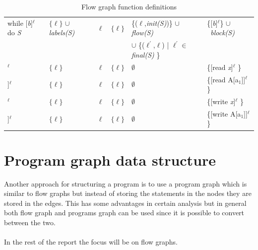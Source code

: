 \begin{table}
{\begin{minipage}{\textwidth}
\begin{tabular}{| l | l | l | l | l | l |}
\hline
while [\textsl{b}]$^\ell$ do \textsl{S} & $\{\ell\}$ $\cup$  \textsl{labels(S)}                 &$\ell$                & $\{\ell\}$ & \{($\ell$,\textsl{init(S)})\} $\cup$\textsl{flow(S)}                 & \{[\textsl{b}]$^\ell$\} $\cup$\ \textsl{block(S)} \\
&&&&$\cup$ \{($\ell^{'}$,$\ell$) |  $\ell^{'}\in$ \textsl{final(S)} \}&\\
\hline
[read \textsl{x}]$^\ell$                & $\{\ell\}$                                            &$\ell$                & $\{\ell\}$ & $\emptyset$                                            &\{[read \textsl{x}]$^\ell$ \}  \\
\hline
[read A[a$_1$]]$^\ell$                & $\{\ell\}$                                            &$\ell$                & $\{\ell\}$  & $\emptyset$                                            &\{[read A[a$_1$]]$^\ell$ \}   \\
\hline
[write \textsl{x}]$^\ell$               & $\{\ell\}$                                            &$\ell$                & $\{\ell\}$  & $\emptyset$                                          &\{[write \textsl{x}]$^\ell$ \} \\
\hline
[write A[a$_1$]]$^\ell$               & $\{\ell\}$                                            &$\ell$                & $\{\ell\}$  & $\emptyset$                                          &\{[write A[a$_1$]]$^\ell$\} \\
\hline
\end{tabular}
      \end{minipage}}

\centering
\caption{Flow graph function definitions}
\label{table:flow_graph_functions}
\end{table}

\section{Program graph data structure}
Another approach for structuring a program is to use a program graph which is similar to flow graphs but instead of storing the statements in the nodes they are stored in the edges. This has some advantages in certain analysis but in general both flow graph and programs graph can be used since it is possible to convert between the two.
\\\\
In the rest of the report the focus will be on flow graphs.